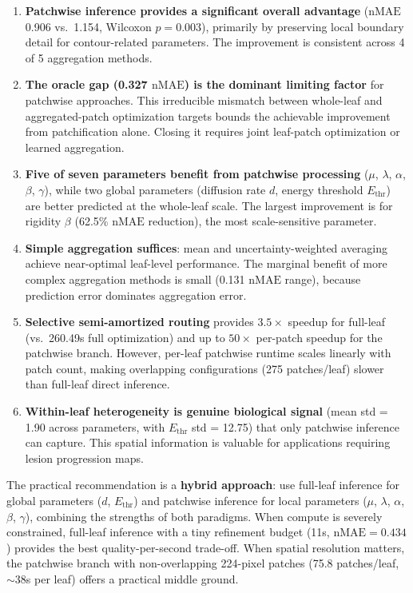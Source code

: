 \documentclass[11pt,a4paper]{article}
\newcommand{\nMAE}{\mathrm{nMAE}}
\begin{document}
\begin{enumerate}
    \item \textbf{Patchwise inference provides a significant overall advantage} ($\nMAE$ 0.906 vs.\ 1.154, Wilcoxon $p = 0.003$), primarily by preserving local boundary detail for contour-related parameters. The improvement is consistent across 4 of 5 aggregation methods.

    \item \textbf{The oracle gap (0.327 $\nMAE$) is the dominant limiting factor} for patchwise approaches. This irreducible mismatch between whole-leaf and aggregated-patch optimization targets bounds the achievable improvement from patchification alone. Closing it requires joint leaf-patch optimization or learned aggregation.

    \item \textbf{Five of seven parameters benefit from patchwise processing} ($\mu$, $\lambda$, $\alpha$, $\beta$, $\gamma$), while two global parameters (diffusion rate $d$, energy threshold $E_\mathrm{thr}$) are better predicted at the whole-leaf scale. The largest improvement is for rigidity $\beta$ (62.5\% $\nMAE$ reduction), the most scale-sensitive parameter.

    \item \textbf{Simple aggregation suffices}: mean and uncertainty-weighted averaging achieve near-optimal leaf-level performance. The marginal benefit of more complex aggregation methods is small (0.131 $\nMAE$ range), because prediction error dominates aggregation error.

    \item \textbf{Selective semi-amortized routing} provides $3.5\times$ speedup for full-leaf (vs.\ 260.49s full optimization) and up to $50\times$ per-patch speedup for the patchwise branch. However, per-leaf patchwise runtime scales linearly with patch count, making overlapping configurations (275 patches/leaf) slower than full-leaf direct inference.

    \item \textbf{Within-leaf heterogeneity is genuine biological signal} (mean std = 1.90 across parameters, with $E_\mathrm{thr}$ std = 12.75) that only patchwise inference can capture. This spatial information is valuable for applications requiring lesion progression maps.
\end{enumerate}

The practical recommendation is a \textbf{hybrid approach}: use full-leaf inference for global parameters ($d$, $E_\mathrm{thr}$) and patchwise inference for local parameters ($\mu$, $\lambda$, $\alpha$, $\beta$, $\gamma$), combining the strengths of both paradigms.
When compute is severely constrained, full-leaf inference with a tiny refinement budget (11s, $\nMAE = 0.434$) provides the best quality-per-second trade-off.
When spatial resolution matters, the patchwise branch with non-overlapping 224-pixel patches (75.8 patches/leaf, $\sim$38s per leaf) offers a practical middle ground.
\end{document}
